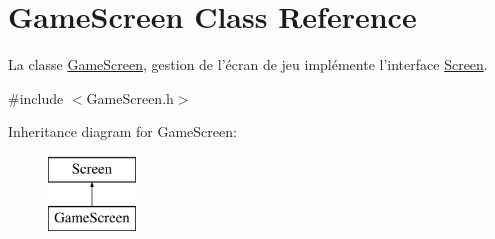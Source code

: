 \hypertarget{classGameScreen}{\section{Game\-Screen Class Reference}
\label{classGameScreen}
}


La classe \hyperlink{classGameScreen}{Game\-Screen}, gestion de l'écran de jeu implémente l'interface \hyperlink{classScreen}{Screen}.  




{\ttfamily \#include $<$Game\-Screen.\-h$>$}

Inheritance diagram for Game\-Screen\-:\begin{figure}[H]
\begin{center}
\leavevmode
\includegraphics[height=2.000000cm]{classGameScreen}
\end{center}
\end{figure}
